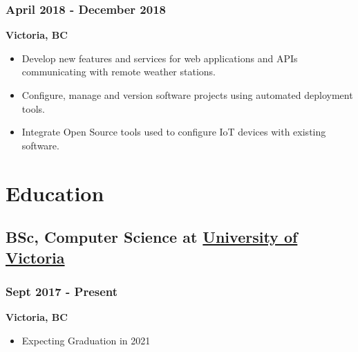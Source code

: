 \documentclass[letterpaper]{article}
\begin{document}
\subsubsection{April 2018 - December 2018}
\label{sec:org1024c5a}
\textbf{Victoria, BC}
\begin{itemize}
\item Develop new features and services for web applications and APIs communicating with remote weather stations.
\item Configure, manage and version software projects using automated deployment tools.
\item Integrate Open Source tools used to configure IoT devices with existing software.
\end{itemize}
\section{Education}
\label{sec:org3c7813f}
\subsection{BSc, Computer Science at \href{https://uvic.ca}{University of Victoria}}
\label{sec:org7b99cb2}
\subsubsection{Sept 2017 - Present}
\label{sec:orge41b31d}
\textbf{Victoria, BC}
\begin{itemize}
\item Expecting Graduation in 2021
\end{itemize}
\end{document}
